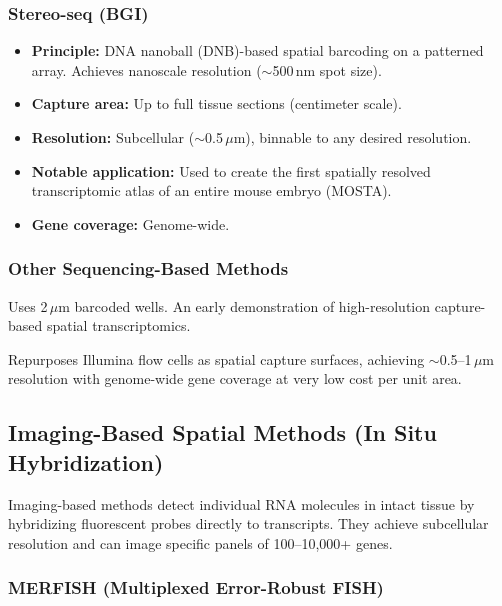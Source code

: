 \subsubsection{Stereo-seq (BGI)}

\begin{itemize}[nosep]
  \item \textbf{Principle:} DNA nanoball (DNB)-based spatial barcoding on a
    patterned array. Achieves nanoscale resolution ($\sim$500\,nm spot size).
  \item \textbf{Capture area:} Up to full tissue sections (centimeter scale).
  \item \textbf{Resolution:} Subcellular ($\sim$0.5\,$\mu$m), binnable to any
    desired resolution.
  \item \textbf{Notable application:} Used to create the first spatially
    resolved transcriptomic atlas of an entire mouse embryo (MOSTA).
  \item \textbf{Gene coverage:} Genome-wide.
\end{itemize}

\subsubsection{Other Sequencing-Based Methods}

\begin{description}[style=nextline]
  \item[HDST (High-Definition Spatial Transcriptomics)] Uses 2\,$\mu$m
    barcoded wells. An early demonstration of high-resolution capture-based
    spatial transcriptomics.
  \item[Seq-Scope] Repurposes Illumina flow cells as spatial capture surfaces,
    achieving $\sim$0.5--1\,$\mu$m resolution with genome-wide gene coverage
    at very low cost per unit area.
\end{description}


\subsection{Imaging-Based Spatial Methods (In Situ Hybridization)}
\label{sec:spatial:imaging}

Imaging-based methods detect individual RNA molecules in intact tissue by
hybridizing fluorescent probes directly to transcripts. They achieve
subcellular resolution and can image specific panels of 100--10,000+ genes.

\subsubsection{MERFISH (Multiplexed Error-Robust FISH)}

